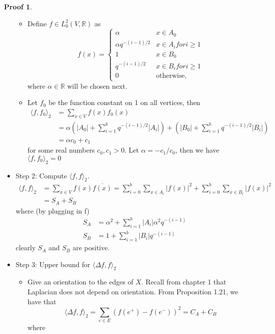 \documentclass{book}
\newcommand{\R}{\mathbb{R}}
\newcommand{\inner}[1]{\langle #1 \rangle}
\newcommand{\abs}[1]{\lvert #1 \rvert }
\theoremstyle{definition}
\theoremstyle{remarkstyle}
\newtheorem*{myproof}{Proof}%
\begin{document}
\begin{myproof}
\begin{itemize}
\begin{itemize}
            \item Define $f\in L^{2}_{0}(V, \R) $ as $$f(x) = \left\{ \begin{array}{ll} \alpha & x \in A_{0} \\ \alpha q^{-(i-1)/2} & x \in A_{i} for i \ge 1 \\ 1 & x \in B_{0} \\ q^{-(i-1)/2} & x\in B_{i} for i \ge 1 \\ 0 & \textrm{otherwise,}  \end{array} \right. $$ where $\alpha \in \R$ will be chosen next. 
            \item Let $f_{0}$ be the function constant on 1 on all vertices, then \begin{align*}
                \inner{f,f_{0}}_{2} &= \sum_{x\in V}f(x)f_{0}(x) \\
                &= \alpha \left( \abs{A_{0}} + \sum^{b}_{i=1}q^{-(i-1)/2}\abs{A_{i}}  \right) + \left( \abs{B_{0}} + \sum^{b}_{i=1}q^{-(i-1)/2}\abs{B_{i}}  \right) \\ &= \alpha c_{0} + c_{1} 
            \end{align*}
            for some real numbers $c_{0}, c_{1} > 0 $. Let $\alpha = -c_{1}/c_{0} $, then we have $\inner{f,f_{0}}_{2}=0 $
        \end{itemize}
        \item Step 2: Compute $\inner{f,f}_{2}$. 
        \begin{align*}
            \inner{f,f}_{2} &= \sum_{x\in V}f(x)\overline{f(x)} = \sum^{b}_{i=0}\sum_{x\in A_{i}}\abs{f(x)}^{2}+\sum_{i=0}^{b}\sum_{x\in B_{i}}\abs{f(x)}^{2} \\ &= S_{A}+S_{B}
        \end{align*}
        where (by plugging in f)
        \begin{align*}
            S_{A} &= \alpha^{2}+\sum^{b}_{i=1}\abs{A_{i}}\alpha^{2}q^{-(i-1)} \\
            S_{B} &= 1 + \sum_{i=1}^{b}\abs{B_{i}}q^{-(i-1)}
        \end{align*}
        clearly $S_{A}$ and $S_{B} $ are positive. 
        \item Step 3: Upper bound for $\inner{\Delta f, f}_{2} $
        \begin{itemize}
            \item Give an orientation to the edges of $X$. Recall from chapter 1 that Laplacian does not depend on orientation. From Proposition 1.21, we have that $$\inner{\Delta f,f}_{2} = \sum_{e\in E}(f(e^{+}) - f(e^{-}))^{2} = C_{A}+C_{B} $$ where \begin{align*}

\end{align*}
\end{itemize}
\end{itemize}
\end{myproof}
\end{document}

